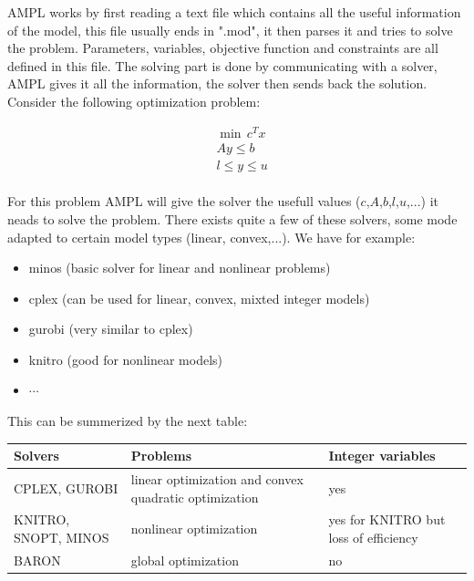 AMPL works by first reading a text file which contains all the useful information of the model, this file usually ends in ".mod", it then parses it and tries to solve the problem. Parameters, variables, objective function and constraints are all defined in this file. The solving part is done by communicating with a solver, AMPL gives it all the information, the solver then sends back the solution. 
Consider the following optimization problem:

\begin{align*}
          &\min \, c^Tx  \\ 
       	 & Ay\le b\\
	 & l\le y\le u
\end{align*}
\\

For this problem AMPL will give the solver the usefull values ($c$,$A$,$b$,$l$,$u$,...) it neads to solve the problem. There exists quite a few of these solvers, some mode adapted to certain model types (linear, convex,...). 
We have for example:

\begin{itemize}
  \item minos (basic solver for linear and nonlinear problems)
  \item cplex (can be used for linear, convex, mixted integer models)
  \item gurobi (very similar to cplex)
  \item knitro (good for nonlinear models)
  \item $\cdots$
\end{itemize} 

This can be summerized by the next table: 

\begin{tabular}{|C{0.2 \textwidth}|L{0.5 \textwidth}|C{0.2 \textwidth}|}
\hline
Solvers & Problems & Integer variables \\
\hline
\hline
CPLEX, GUROBI & linear optimization and convex quadratic optimization & yes \\
\hline
KNITRO, SNOPT, MINOS & nonlinear optimization & yes for KNITRO but loss of efficiency \\
\hline
BARON & global optimization & no \\
\hline
\end{tabular}

